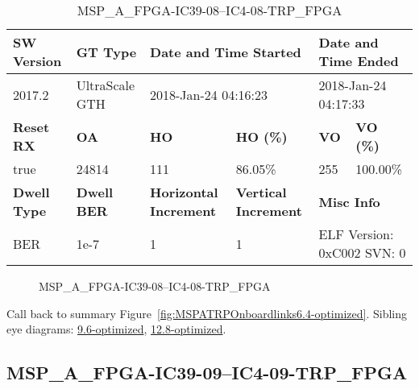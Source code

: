 \begin{table}[h]
\centering
\caption{MSP\_A\_FPGA-IC39-08--IC4-08-TRP\_FPGA}
\label{tab:MSPAFPGAIC3908IC408TRPFPGA6.4-optimized}
\begin{tabular}{@{}|l|l|l|l|l|l|@{}}
\toprule
\textbf{SW Version}                & \textbf{GT Type}   & \multicolumn{2}{l|}{\textbf{Date and Time Started}}            & \multicolumn{2}{l|}{\textbf{Date and Time Ended}}        \\ \midrule
2017.2                       & UltraScale GTH          & \multicolumn{2}{l|}{2018-Jan-24 04:16:23}                   & \multicolumn{2}{l|}{2018-Jan-24 04:17:33}               \\ \midrule
\textbf{Reset RX}                  & \textbf{OA} & \textbf{HO}   & \textbf{HO (\%)} & \textbf{VO} & \textbf{VO (\%)} \\ \midrule
true & 24814        & 111          & 86.05\%        & 255        & 100.00\%       \\ \midrule
\textbf{Dwell Type}                & \textbf{Dwell BER} & \textbf{Horizontal Increment} & \textbf{Vertical Increment}    & \multicolumn{2}{l|}{\textbf{Misc Info}}                  \\ \midrule
BER                            & 1e-7        & 1        & 1           & \multicolumn{2}{l|}{ELF Version: 0xC002 SVN: 0}                         \\ \bottomrule
\end{tabular}
\end{table}

\begin{figure}[h]
\caption{MSP\_A\_FPGA-IC39-08--IC4-08-TRP\_FPGA} \label{fig:MSPAFPGAIC3908IC408TRPFPGA6.4-optimized}
\end{figure}

Call back to summary Figure~\ref{fig:MSPATRPOnboardlinks6.4-optimized}.
Sibling eye diagrams: \hyperref[sec:MSPAFPGAIC3908IC408TRPFPGA9.6-optimized]{9.6-optimized}, \hyperref[sec:MSPAFPGAIC3908IC408TRPFPGA12.8-optimized]{12.8-optimized}.

\clearpage
\newpage


\subsection{MSP\_A\_FPGA-IC39-09--IC4-09-TRP\_FPGA}\label{sec:MSPAFPGAIC3909IC409TRPFPGA6.4-optimized}

